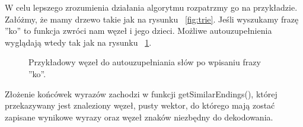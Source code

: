 \documentclass[twoside,a4paper]{book}
\begin{document}
W celu lepszego zrozumienia działania algorytmu rozpatrzmy go na przykładzie. Załóżmy, że mamy drzewo takie jak na rysunku ~\ref{fig:trie}. Jeśli wyszukamy frazę ''ko'' to funkcja zwróci nam węzeł i jego dzieci. Możliwe autouzupełnienia wyglądają wtedy tak jak na rysunku ~\ref{fig:trieKO}.
\begin{figure}[!h]
		\centering
		\caption{Przykładowy węzeł do autouzupełniania słów po wpisaniu frazy ''ko''. }
		\label{fig:trieKO}
		\end{figure}
Złożenie końcówek wyrazów zachodzi w funkcji getSimilarEndings(), której przekazywany jest znaleziony
 węzeł, pusty wektor, do którego mają zostać zapisane wynikowe wyrazy oraz węzeł znaków niezbędny do dekodowania. 
\end{document}
